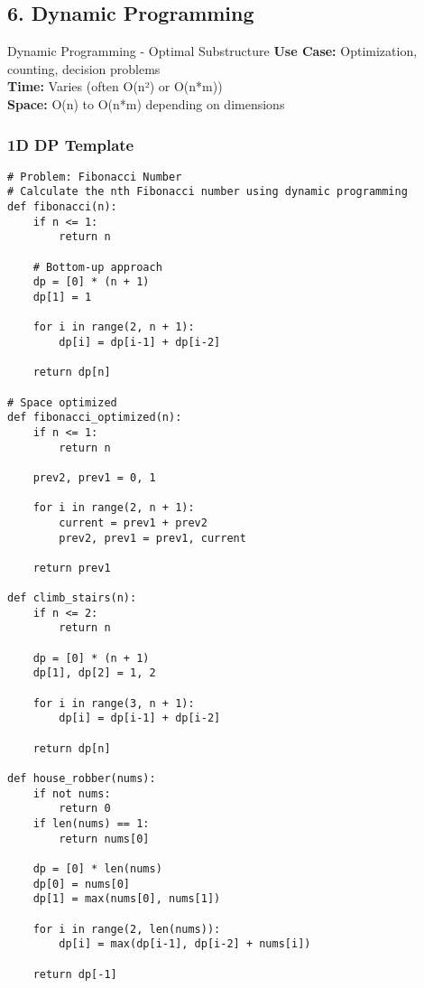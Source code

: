 \documentclass[10pt,a4paper]{article}
\begin{document}
\subsection{6. Dynamic Programming}

\begin{patternbox}{Dynamic Programming - Optimal Substructure}
\textbf{Use Case:} Optimization, counting, decision problems\\
\textbf{Time:} Varies (often O(n²) or O(n*m))\\
\textbf{Space:} O(n) to O(n*m) depending on dimensions
\end{patternbox}

\subsubsection{1D DP Template}
\begin{lstlisting}
# Problem: Fibonacci Number
# Calculate the nth Fibonacci number using dynamic programming
def fibonacci(n):
    if n <= 1:
        return n

    # Bottom-up approach
    dp = [0] * (n + 1)
    dp[1] = 1

    for i in range(2, n + 1):
        dp[i] = dp[i-1] + dp[i-2]

    return dp[n]

# Space optimized
def fibonacci_optimized(n):
    if n <= 1:
        return n

    prev2, prev1 = 0, 1

    for i in range(2, n + 1):
        current = prev1 + prev2
        prev2, prev1 = prev1, current

    return prev1

def climb_stairs(n):
    if n <= 2:
        return n

    dp = [0] * (n + 1)
    dp[1], dp[2] = 1, 2

    for i in range(3, n + 1):
        dp[i] = dp[i-1] + dp[i-2]

    return dp[n]

def house_robber(nums):
    if not nums:
        return 0
    if len(nums) == 1:
        return nums[0]

    dp = [0] * len(nums)
    dp[0] = nums[0]
    dp[1] = max(nums[0], nums[1])

    for i in range(2, len(nums)):
        dp[i] = max(dp[i-1], dp[i-2] + nums[i])

    return dp[-1]
\end{lstlisting}
\end{document}
